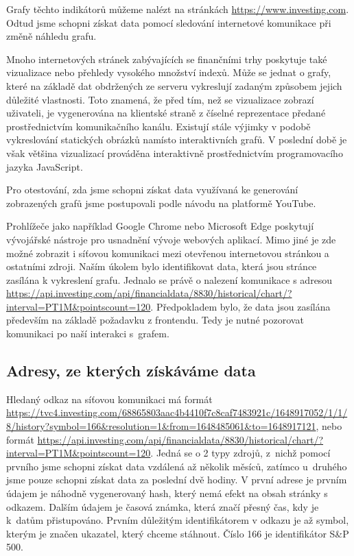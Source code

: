 Grafy těchto indikátorů můžeme nalézt na stránkách \url{https://www.investing.com}. 
Odtud jsme schopni získat data pomocí sledování internetové komunikace při změně náhledu grafu. 

Mnoho internetových stránek zabývajících se finančními trhy poskytuje také vizualizace nebo přehledy vysokého množství indexů. 
Může se jednat o grafy, které na základě dat obdržených ze serveru vykreslují zadaným způsobem jejich důležité vlastnosti. 
Toto znamená, že před tím, než se vizualizace zobrazí uživateli, je vygenerována na klientské straně z číselné reprezentace předané prostřednictvím komunikačního kanálu. 
Existují stále výjimky v podobě vykreslování statických obrázků namísto interaktivních grafů. 
V poslední době je však většina vizualizací prováděna interaktivně prostřednictvím programovacího jazyka JavaScript. 

Pro otestování, zda jsme schopni získat data využívaná ke generování zobrazených grafů jsme postupovali podle návodu  \cite{yt-scrape} na platformě YouTube.

Prohlížeče jako například Google Chrome nebo Microsoft Edge poskytují vývojářské nástroje pro usnadnění vývoje webových aplikací. 
Mimo jiné je zde možné zobrazit i síťovou komunikaci mezi otevřenou internetovou stránkou a ostatními zdroji. 
Naším úkolem bylo identifikovat data, která jsou stránce zasílána k vykreslení grafu.
Jednalo se právě o nalezení komunikace s adresou \url{https://api.investing.com/api/financialdata/8830/historical/chart/?interval=PT1M&pointscount=120}.
Předpokladem bylo, že data jsou zasílána především na základě požadavku z frontendu. 
Tedy je nutné pozorovat komunikaci po naší interakci s~grafem.

\subsection{Adresy, ze kterých získáváme data}

Hledaný odkaz na síťovou komunikaci má formát \url{https://tvc4.investing.com/68865803aac4b4410f7c8caf7483921c/1648917052/1/1/8/history?symbol=166&resolution=1&from=1648485061&to=1648917121}, nebo formát \url{https://api.investing.com/api/financialdata/8830/historical/chart/?interval=PT1M&pointscount=120}.
Jedná se o 2 typy zdrojů, z~nichž pomocí prvního jsme schopni získat data vzdálená až několik měsíců, zatímco u~druhého jsme pouze schopni získat data za poslední dvě hodiny.
V první adrese je prvním údajem je náhodně vygenerovaný hash, který nemá efekt na obsah stránky s odkazem. 
Dalším údajem je časová známka, která značí přesný čas, kdy je k~datům přistupováno. 
Prvním důležitým identifikátorem v odkazu je až symbol, kterým je značen ukazatel, který chceme stáhnout. 
Číslo 166 je identifikátor S\&P 500. 

